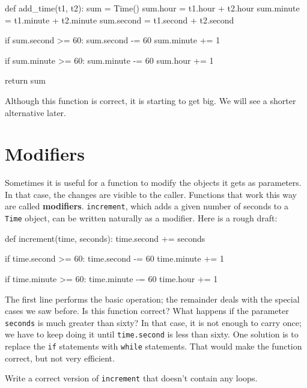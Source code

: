 \beforeverb
\begin{pycode}
def add_time(t1, t2):
    sum = Time()
    sum.hour = t1.hour + t2.hour
    sum.minute = t1.minute + t2.minute
    sum.second = t1.second + t2.second

    if sum.second >= 60:
        sum.second -= 60
        sum.minute += 1

    if sum.minute >= 60:
        sum.minute -= 60
        sum.hour += 1

    return sum
\end{pycode}
\afterverb
%
Although this function is correct, it is starting to get big.
We will see a shorter alternative later.


\section{Modifiers}
\label{increment}


Sometimes it is useful for a function to modify the objects it gets as
parameters.  In that case, the changes are visible to the caller.
Functions that work this way are called {\bf modifiers}.
%
%
{\tt increment}, which adds a given number of seconds to a {\tt Time}
object, can be written naturally as a
modifier.  Here is a rough draft:

\beforeverb
\begin{pycode}
def increment(time, seconds):
    time.second += seconds

    if time.second >= 60:
        time.second -= 60
        time.minute += 1

    if time.minute >= 60:
        time.minute -= 60
        time.hour += 1
\end{pycode}
\afterverb
%
The first line performs the basic operation; the remainder deals
with the special cases we saw before.
%
%
Is this function correct?  What happens if the parameter {\tt seconds}
is much greater than sixty?  
%
In that case, it is not enough to carry
once; we have to keep doing it until {\tt time.second} is less than sixty.
One solution is to replace the {\tt if} statements with {\tt while}
statements.  That would make the function correct, but not
very efficient.

\begin{exercise}
Write a correct version of {\tt increment} that
doesn't contain any loops.
\end{exercise}

